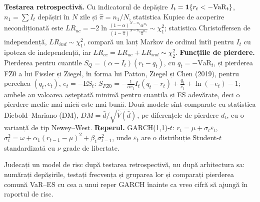 %
{\textbf{Testarea retrospectivă.} Cu indicatorul de depășire $I_t=\mathbf{1}\{r_t<-\mathrm{VaR}_t\}$, $n_1=\sum I_t$ depășiri în $N$ zile și $\hat\pi=n_1/N$, statistica Kupiec de acoperire necondiționată este
$LR_{uc}=-2\ln\frac{(1-\alpha)^{N-n_1}\alpha^{n_1}}{(1-\hat\pi)^{N-n_1}\hat\pi^{n_1}}\sim\chi^2_1$; statistica Christoffersen de independență, $LR_{ind}\sim\chi^2_1$, compară un lanț Markov de ordinul întîi pentru $I_t$ cu ipoteza de independență, iar $LR_{cc}=LR_{uc}+LR_{ind}\sim\chi^2_2$.
\textbf{Funcțiile de pierdere.} Pierderea pentru cuantile $S_Q=(\alpha-I_t)(r_t-q_t)$, cu $q_t=-\mathrm{VaR}_t$, și pierderea FZ0 a lui Fissler și Ziegel, în forma lui Patton, Ziegel și Chen (2019), pentru perechea $(q_t,e_t)$, $e_t=-\mathrm{ES}_t$:
$S_{FZ0}=-\frac{1}{\alpha e_t}I_t(q_t-r_t)+\frac{q_t}{e_t}+\ln(-e_t)-1$; ambele au valoarea așteptată minimă pentru cuantila și ES adevărate, deci o pierdere medie mai mică este mai bună. Două modele sînt comparate cu statistica Diebold--Mariano (DM), $DM=\bar d/\sqrt{\hat V(\bar d)}$, pe diferențele de pierdere $d_t$, cu o varianță de tip Newey--West.
\textbf{Reperul.} GARCH(1,1)-$t$: $r_t=\mu+\sigma_t\varepsilon_t$, $\sigma_t^2=\omega+\alpha_1(r_{t-1}-\mu)^2+\beta_1\sigma_{t-1}^2$, unde $\varepsilon_t$ are o distribuție Student-$t$ standardizată cu $\nu$ grade de libertate.}
\begin{decision}
%
{Judecați un model de risc după testarea retrospectivă, nu după arhitectura sa: numărați depășirile, testați frecvența și gruparea lor și comparați pierderea comună VaR--ES cu cea a unui reper GARCH înainte ca vreo cifră să ajungă în raportul de risc.}
\end{decision}

